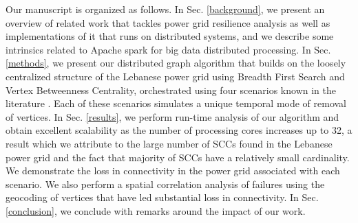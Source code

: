 Our manuscript is organized as follows. In Sec. \ref{background}, we present an overview of related work that tackles power grid resilience analysis as well as implementations of it that runs on distributed systems, and we describe some intrinsics related to Apache spark for big data distributed processing. In Sec. \ref{methods}, we present our distributed graph algorithm that builds on the loosely centralized structure of the Lebanese power grid using Breadth First Search and Vertex Betweenness Centrality, orchestrated using four scenarios known in the literature \cite{2000Natur.406..378A}. Each of these scenarios simulates a unique temporal mode of removal of vertices. In Sec. \ref{results}, we perform run-time analysis of our algorithm and obtain excellent scalability as the number of processing cores increases up to 32, a result which we attribute to the large number of SCCs found in the Lebanese power grid and the fact that majority of SCCs have a relatively small cardinality. We demonstrate the loss in connectivity in the power grid associated with each scenario. We also perform a spatial correlation analysis of failures using the geocoding of vertices that have led substantial loss in connectivity. In Sec. \ref{conclusion}, we conclude with remarks around the impact of our work.%





